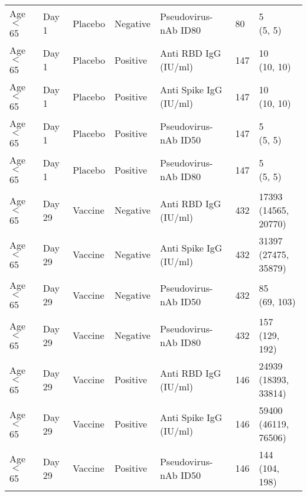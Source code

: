\documentclass[]{book}
\theoremstyle{definition}
\theoremstyle{definition}
\theoremstyle{definition}
\newcommand{\1}{\mathbbm{1}}
\begin{document}
\begin{landscape}
\begin{ThreePartTable}
\begin{longtable}[t]{>{\raggedright\arraybackslash}p{7cm}llllll}
\hspace{1em}Age $<$ 65 & Day 1 & Placebo & Negative & Pseudovirus-nAb ID80 & 80 & \makecell[l]{5\\(5, 5)}\\
\hspace{1em}Age $<$ 65 & Day 1 & Placebo & Positive & Anti RBD IgG (IU/ml) & 147 & \makecell[l]{10\\(10, 10)}\\
\hspace{1em}Age $<$ 65 & Day 1 & Placebo & Positive & Anti Spike IgG (IU/ml) & 147 & \makecell[l]{10\\(10, 10)}\\
\hspace{1em}Age $<$ 65 & Day 1 & Placebo & Positive & Pseudovirus-nAb ID50 & 147 & \makecell[l]{5\\(5, 5)}\\
\hspace{1em}Age $<$ 65 & Day 1 & Placebo & Positive & Pseudovirus-nAb ID80 & 147 & \makecell[l]{5\\(5, 5)}\\
\hspace{1em}Age $<$ 65 & Day 29 & Vaccine & Negative & Anti RBD IgG (IU/ml) & 432 & \makecell[l]{17393\\(14565, 20770)}\\
\hspace{1em}Age $<$ 65 & Day 29 & Vaccine & Negative & Anti Spike IgG (IU/ml) & 432 & \makecell[l]{31397\\(27475, 35879)}\\
\hspace{1em}Age $<$ 65 & Day 29 & Vaccine & Negative & Pseudovirus-nAb ID50 & 432 & \makecell[l]{85\\(69, 103)}\\
\hspace{1em}Age $<$ 65 & Day 29 & Vaccine & Negative & Pseudovirus-nAb ID80 & 432 & \makecell[l]{157\\(129, 192)}\\
\hspace{1em}Age $<$ 65 & Day 29 & Vaccine & Positive & Anti RBD IgG (IU/ml) & 146 & \makecell[l]{24939\\(18393, 33814)}\\
\hspace{1em}Age $<$ 65 & Day 29 & Vaccine & Positive & Anti Spike IgG (IU/ml) & 146 & \makecell[l]{59400\\(46119, 76506)}\\
\hspace{1em}Age $<$ 65 & Day 29 & Vaccine & Positive & Pseudovirus-nAb ID50 & 146 & \makecell[l]{144\\(104, 198)}\\

\end{longtable}
\end{ThreePartTable}
\end{landscape}
\end{document}

